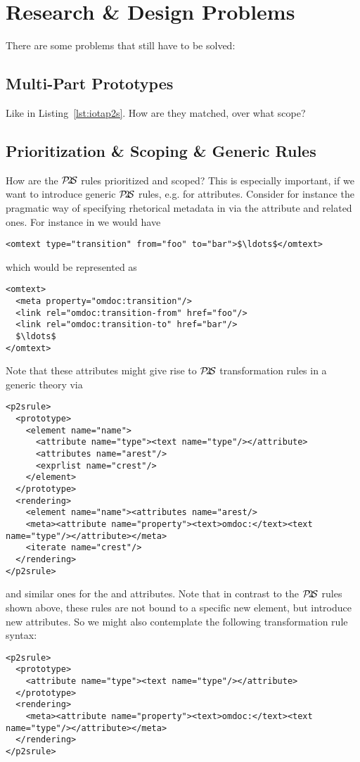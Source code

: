 \documentclass{article}
\def\ptos{\ensuremath{\mathcal{P}\kern-.2em2\kern-.2em\mathcal{S}}}
\begin{document}
\section{Research \& Design Problems}\label{sec:problems}
There are some problems that still have to be solved:

\subsection{Multi-Part Prototypes} 
Like in Listing~\ref{lst:iotap2s}. How are they matched, over what scope?

\subsection{Prioritization \& Scoping \& Generic Rules}
How are the {\ptos} rules prioritized and scoped? This is especially important, if we want
to introduce generic {\ptos} rules, e.g. for attributes. Consider for instance the
pragmatic way of specifying rhetorical metadata in {} via the
{} attribute and related ones. For instance in {} we
would have
\begin{lstlisting}[mathescape]
<omtext type="transition" from="foo" to="bar">$\ldots$</omtext>
\end{lstlisting}
which would be represented as 
\begin{lstlisting}[mathescape]
<omtext>
  <meta property="omdoc:transition"/>
  <link rel="omdoc:transition-from" href="foo"/>
  <link rel="omdoc:transition-to" href="bar"/>
  $\ldots$
</omtext>
\end{lstlisting}
Note that these attributes might give rise to {\ptos} transformation rules in a generic
{} theory via 
\begin{lstlisting}[mathescape]
<p2srule>
  <prototype>
    <element name="name">
      <attribute name="type"><text name="type"/></attribute>
      <attributes name="arest"/>
      <exprlist name="crest"/>
    </element>
  </prototype>
  <rendering>
    <element name="name"><attributes name="arest/>
    <meta><attribute name="property"><text>omdoc:</text><text name="type"/></attribute></meta>
    <iterate name="crest"/>
  </rendering>
</p2srule>  
\end{lstlisting}
and similar ones for the {} and {}
attributes. Note that in contrast to the {\ptos} rules shown above, these rules are not
bound to a specific new element, but introduce new attributes. So we might also contemplate the
following transformation rule syntax:
\begin{lstlisting}[mathescape]
<p2srule>
  <prototype>
    <attribute name="type"><text name="type"/></attribute>
  </prototype>
  <rendering>
    <meta><attribute name="property"><text>omdoc:</text><text name="type"/></attribute></meta>
  </rendering>
</p2srule>  
\end{lstlisting}
\end{document}
